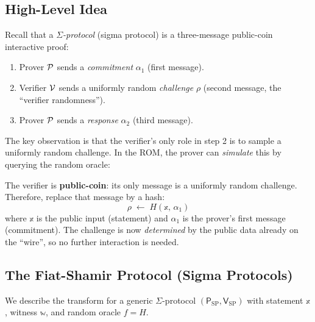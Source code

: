 \documentclass[11pt]{article}
\begin{document}
\subsection{High-Level Idea}

Recall that a \emph{$\Sigma$-protocol} (sigma protocol) is a
three-message public-coin interactive proof:
\begin{enumerate}
  \item Prover $\mathcal{P}$ sends a \emph{commitment} $\alpha_1$ (first message).
  \item Verifier $\mathcal{V}$ sends a uniformly random \emph{challenge}
        $\rho$ (second message, the ``verifier randomness'').
  \item Prover $\mathcal{P}$ sends a \emph{response} $\alpha_2$ (third message).
\end{enumerate}

The key observation is that the verifier's only role in step 2 is to
sample a uniformly random challenge.  In the ROM, the prover can
\emph{simulate} this by querying the random oracle:

\begin{tcolorbox}[colback=green!5, colframe=green!40!black,
                  title={Fiat-Shamir: Replace the Verifier with a Random Oracle}]
  The verifier is \textbf{public-coin}: its only message is a uniformly
  random challenge.  Therefore, replace that message by a hash:
  \[
    \rho \;\leftarrow\; H(\mathbb{x},\, \alpha_1)
  \]
  where $\mathbb{x}$ is the public input (statement) and $\alpha_1$ is
  the prover's first message (commitment).  The challenge is now
  \emph{determined} by the public data already on the ``wire'', so no
  further interaction is needed.
\end{tcolorbox}

\subsection{The Fiat-Shamir Protocol (Sigma Protocols)}

We describe the transform for a generic $\Sigma$-protocol
$(\mathsf{P}_{\mathrm{SP}}, \mathsf{V}_{\mathrm{SP}})$ with statement
$\mathbb{x}$, witness $\mathbb{w}$, and random oracle $f = H$.
\end{document}
